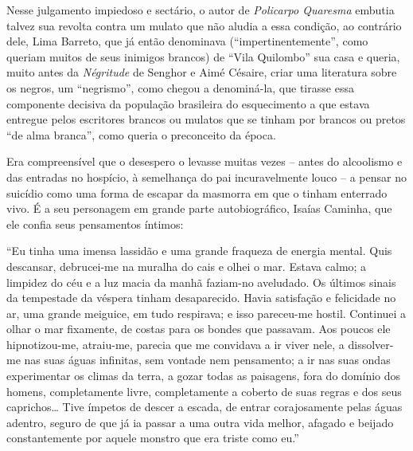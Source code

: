 \documentclass[
  letterpaper,
  DIV=11,
  numbers=noendperiod]{scrreprt}
\begin{document}
Nesse julgamento impiedoso e sectário, o autor de \emph{Policarpo
Quaresma} embutia talvez sua revolta contra um mulato que não aludia a
essa condição, ao contrário dele, Lima Barreto, que já então denominava
(``impertinentemente'', como queriam muitos de seus inimigos brancos) de
``Vila Quilombo'' sua casa e queria, muito antes da \emph{Négritude} de
Senghor e Aimé Césaire, criar uma literatura sobre os negros, um
``negrismo'', como chegou a denominá-la, que tirasse essa componente
decisiva da população brasileira do esquecimento a que estava entregue
pelos escritores brancos ou mulatos que se tinham por brancos ou pretos
``de alma branca'', como queria o preconceito da época.

Era compreensível que o desespero o levasse muitas vezes -- antes do
alcoolismo e das entradas no hospício, à semelhança do pai
incuravelmente louco -- a pensar no suicídio como uma forma de escapar
da masmorra em que o tinham enterrado vivo. É a seu personagem em grande
parte autobiográfico, Isaías Caminha, que ele confia seus pensamentos
íntimos:

``Eu tinha uma imensa lassidão e uma grande fraqueza de energia mental.
Quis descansar, debrucei-me na muralha do cais e olhei o mar. Estava
calmo; a limpidez do céu e a luz macia da manhã faziam-no aveludado. Os
últimos sinais da tempestade da véspera tinham desaparecido. Havia
satisfação e felicidade no ar, uma grande meiguice, em tudo respirava; e
isso pareceu-me hostil. Continuei a olhar o mar fixamente, de costas
para os bondes que passavam. Aos poucos ele hipnotizou-me, atraiu-me,
parecia que me convidava a ir viver nele, a dissolver-me nas suas águas
infinitas, sem vontade nem pensamento; a ir nas suas ondas experimentar
os climas da terra, a gozar todas as paisagens, fora do domínio dos
homens, completamente livre, completamente a coberto de suas regras e
dos seus caprichos\ldots{} Tive ímpetos de descer a escada, de entrar
corajosamente pelas águas adentro, seguro de que já ia passar a uma
outra vida melhor, afagado e beijado constantemente por aquele monstro
que era triste como eu.''
\end{document}
